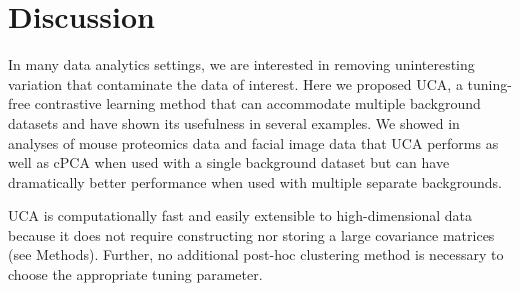 \documentclass[12pt]{article}
\begin{document}
\section{Discussion}
In many data analytics settings, we are interested in removing uninteresting variation that contaminate the data of interest.
Here we proposed UCA, a tuning-free contrastive learning method that can accommodate multiple background datasets and have shown its usefulness in several examples. %
We showed in analyses of mouse proteomics data and facial image data that UCA performs as well as cPCA when used with a single background dataset but can have dramatically better performance when used with multiple separate backgrounds.%

UCA is computationally fast and easily extensible to high-dimensional data because it does not require constructing nor storing a large covariance matrices (see Methods). Further, no additional post-hoc clustering method is necessary to choose the appropriate tuning parameter.
\end{document}
